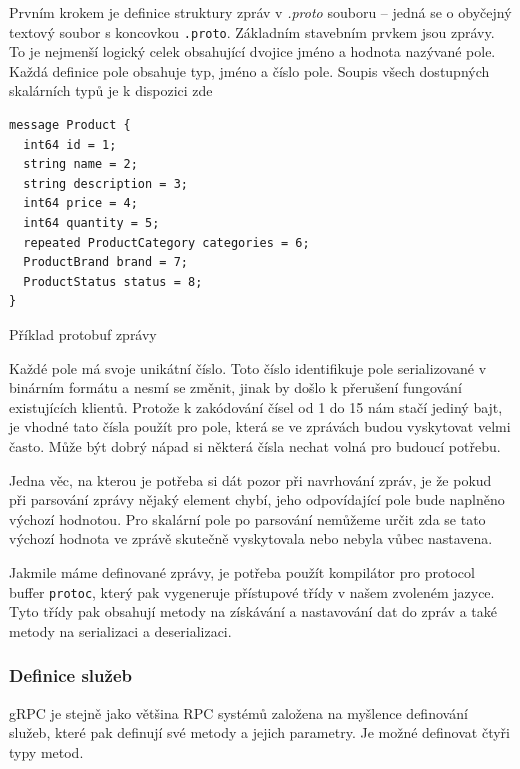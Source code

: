 \documentclass[thesis=M,czech]{FITthesis}[2019/12/23]
\begin{document}
Prvním krokem je definice struktury zpráv v \textit{.proto} souboru -- jedná se o obyčejný textový soubor s koncovkou \texttt{.proto}. Základním stavebním prvkem jsou zprávy. To je nejmenší logický celek obsahující dvojice jméno a hodnota nazývané pole. Každá definice pole obsahuje typ, jméno a číslo pole. Soupis všech dostupných skalárních typů je k dispozici zde \cite{proto_scalars}

\begin{listing}[H]
\begin{verbatim}
message Product {
  int64 id = 1;
  string name = 2;
  string description = 3;
  int64 price = 4;
  int64 quantity = 5;
  repeated ProductCategory categories = 6;
  ProductBrand brand = 7;
  ProductStatus status = 8;
}
\end{verbatim}
\caption{Příklad protobuf zprávy}
\label{lst:protobuf_example}
\end{listing}

Každé pole má svoje unikátní číslo. Toto číslo identifikuje pole serializované v binárním formátu a nesmí se změnit, jinak by došlo k přerušení fungování existujících klientů. Protože k zakódování čísel od 1 do 15 nám stačí jediný bajt, je vhodné tato čísla použít pro pole, která se ve zprávách budou vyskytovat velmi často. Může být dobrý nápad si některá čísla nechat volná pro budoucí potřebu.

Jedna věc, na kterou je potřeba si dát pozor při navrhování zpráv, je že pokud při parsování zprávy nějaký element chybí, jeho odpovídající pole bude naplněno výchozí hodnotou. Pro skalární pole po parsování nemůžeme určit zda se tato výchozí hodnota ve zprávě skutečně vyskytovala nebo nebyla vůbec nastavena. 

Jakmile máme definované zprávy, je potřeba použít kompilátor pro protocol buffer \texttt{protoc}, který pak vygeneruje přístupové třídy v našem zvoleném jazyce. Tyto třídy pak obsahují metody na získávání a nastavování dat do zpráv a také metody na serializaci a deserializaci.

\subsubsection*{Definice služeb}
gRPC je stejně jako většina RPC systémů založena na myšlence definování služeb, které pak definují své metody a jejich parametry. Je možné definovat čtyři typy metod.
\end{document}
